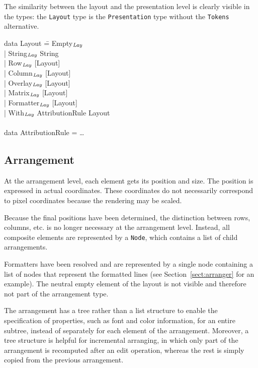 \documentclass{speauth}
\begin{document}
The similarity between the layout and the presentation level is clearly visible in the types: the {\tt Layout} type is the {\tt Presentation} type without the {\tt Tokens} alternative.

\noindent
\ttfamily
\begin{tabbing}
data Layout \= = Empty$_{\mathit{Lay}}$\\
            \> | String$_{\mathit{Lay}}$ String \\
            \> | Row$_{\mathit{Lay}}$ [Layout]\\
            \> | Column$_{\mathit{Lay}}$ [Layout]\\
            \> | Overlay$_{\mathit{Lay}}$ [Layout]\\
            \> | Matrix$_{\mathit{Lay}}$ [Layout]\\
            \> | Formatter$_{\mathit{Lay}}$ [Layout]\\
            \> | With$_{\mathit{Lay}}$ AttributionRule Layout\\
\\
data AttributionRule = \dots\\
\end{tabbing}
\rmfamily


%																
\subsection{Arrangement}

At the arrangement level, each element gets its position and size. The position is expressed in actual coordinates. These coordinates do not necessarily correspond to pixel coordinates because the rendering may be scaled. 

Because the final positions have been determined, the distinction between rows, columns, etc. is no longer necessary at the arrangement level. Instead, all composite elements are represented by a {\tt Node}, which contains a list of child arrangements.  

Formatters have been resolved and are represented by a single node containing a list of nodes that represent the formatted lines (see Section~\ref{sect:arranger} for an example). The neutral empty element of the layout is not visible and therefore not part of the arrangement type.

The arrangement has a tree rather than a list structure to enable the specification of properties, such as font and color information, for an entire subtree, instead of separately for each element of the arrangement. Moreover, a tree structure is helpful for incremental arranging, in which only part of the arrangement is recomputed after an edit operation, whereas the rest is simply copied from the previous arrangement.
\end{document}
